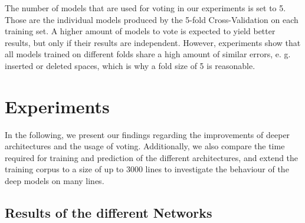 \documentclass{jlcl}
\begin{document}
The number of models that are used for voting in our experiments is set to 5.
Those are the individual models produced by the 5-fold Cross-Validation on each training set.
A higher amount of models to vote is expected to yield better results, but only if their results are independent.
However, experiments show that all models trained on different folds share a high amount of similar errors, e. g. inserted or deleted spaces, which is why a fold size of 5 is reasonable.

\section{Experiments}

In the following, we present our findings regarding the improvements of deeper architectures and the usage of voting.
Additionally, we also compare the time required for training and prediction of the different architectures, and extend the training corpus to a size of up to 3000 lines to investigate the behaviour of the deep models on many lines.

\subsection{Results of the different Networks}
\end{document}
